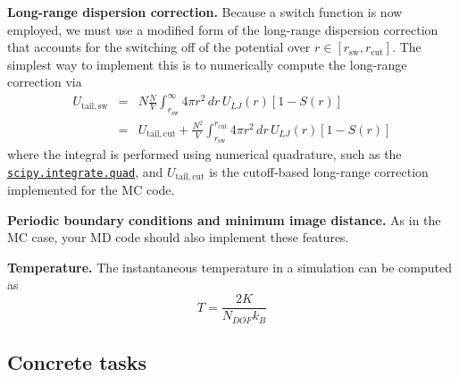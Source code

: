 \documentclass[aip,jcp,preprint,superscriptaddress,floatfix]{revtex4-1}
\begin{document}

\textbf{Long-range dispersion correction.}
Because a switch function is now employed, we must use a modified form of the long-range dispersion correction that accounts for the switching off of the potential over $r \in [r_\mathrm{sw}, r_\mathrm{cut}]$.
The simplest way to implement this is to numerically compute the long-range correction via
\begin{eqnarray}
U_\mathrm{tail,sw} &=& N \frac{N}{V} \int_{r_\mathrm{sw}}^\infty 4 \pi r^2 \, dr \, U_{LJ}(r) [1 - S(r)]  \\
&=& U_\mathrm{tail,cut} + \frac{N^2}{V} \int_{r_\mathrm{sw}}^{r_\mathrm{cut}} 4 \pi r^2 \, dr \, U_{LJ}(r) [1 - S(r)] 
\end{eqnarray}
where the integral is performed using numerical quadrature, such as the \href{https://docs.scipy.org/doc/scipy/reference/generated/scipy.integrate.quad.html}{\tt scipy.integrate.quad}, and $U_\mathrm{tail,cut}$ is the cutoff-based long-range correction implemented for the MC code.

\textbf{Periodic boundary conditions and minimum image distance.} 
As in the MC case, your MD code should also implement these features.

\textbf{Temperature. } The instantaneous temperature in a simulation can be computed as 
\begin{equation}
	T = \frac{2 K}{N_{DOF} k_B}
\end{equation}

\subsection{Concrete tasks}
\end{document}
